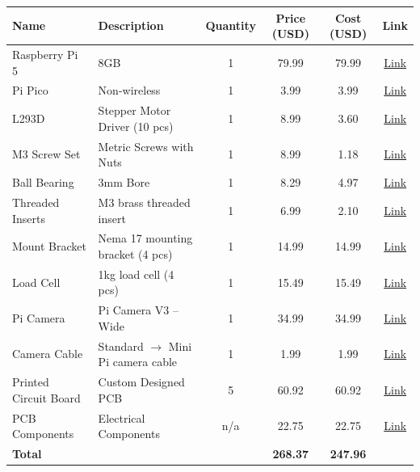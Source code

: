 \begin{tabular}{|l|l|c|c|c|c|}
    \hline
    \textbf{Name} & \textbf{Description} & \textbf{Quantity} & \textbf{Price (USD)} & \textbf{Cost (USD)} & \textbf{Link} \\ \hline
    Raspberry Pi 5 & 8GB & 1 & 79.99 & 79.99 & \href{https://www.microcenter.com/product/673711/raspberry-pi-5-8gb-lpddr4x}{Link} \\ \hline
    Pi Pico & Non-wireless & 1 & 3.99 & 3.99 & \href{https://www.microcenter.com/product/661033/raspberry-pi-pico-microcontroller-development-board}{Link} \\ \hline
    L293D & Stepper Motor Driver (10 pcs) & 1 & 8.99 & 3.60 & \href{https://www.amazon.com/gp/product/B09NBQYVLL/ref=ppx_yo_dt_b_asin_title_o00_s00}{Link} \\ \hline
    M3 Screw Set & Metric Screws with Nuts & 1 & 8.99 & 1.18 & \href{https://www.amazon.com/dp/B0BMQFHD8H?ref_=yo_ov_dt_b_fed_asin_title}{Link} \\ \hline
    Ball Bearing & 3mm Bore & 1 & 8.29 & 4.97 & \href{https://www.amazon.com/dp/B07WF18HQY?ref_=ppx_yo2ov_dt_b_fed_asin_title}{Link} \\ \hline
    Threaded Inserts & M3 brass threaded insert & 1 & 6.99 & 2.10 & \href{https://www.amazon.com/dp/B0CCX33LHD?ref_=ppx_yo2ov_dt_b_fed_asin_title}{Link} \\ \hline
    Mount Bracket & Nema 17 mounting bracket (4 pcs) & 1 & 14.99 & 14.99 & \href{https://www.amazon.com/dp/B07JW6X9ZR?ref_=ppx_yo2ov_dt_b_fed_asin_title}{Link} \\ \hline
    Load Cell & 1kg load cell (4 pcs) & 1 & 15.49 & 15.49 & \href{https://www.amazon.com/dp/B09YTQKQ9G/ref=ppx_yo_dt_b_search_asin_title}{Link} \\ \hline
    Pi Camera & Pi Camera V3 – Wide & 1 & 34.99 & 34.99 & \href{https://www.microcenter.com/product/662018/raspberry-pi-camera-3-wide}{Link} \\ \hline
    Camera Cable & Standard $\rightarrow$ Mini Pi camera cable & 1 & 1.99 & 1.99 & \href{https://www.microcenter.com/product/671933/raspberry-pi-5-camera-cable-300mm}{Link} \\ \hline
    Printed Circuit Board & Custom Designed PCB & 5 & 60.92 & 60.92 & \href{https://jlcpcb.com/}{Link} \\ \hline
    PCB Components & Electrical Components & n/a & 22.75 & 22.75 & \href{https://www.digikey.com/}{Link}\\ \hline
    \textbf{Total} &  &  & \textbf{268.37} & \textbf{247.96} &  \\ \hline
\end{tabular}


